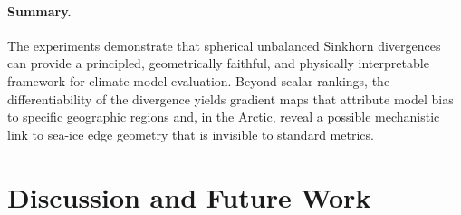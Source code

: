 \documentclass{article}
\theoremstyle{plain}
\theoremstyle{definition}
\theoremstyle{remark}
\begin{document}
\paragraph{Summary.}
The experiments demonstrate that spherical unbalanced Sinkhorn
divergences can provide a principled, geometrically faithful, and
physically interpretable framework for climate model evaluation.
Beyond scalar rankings, the differentiability of the divergence
yields gradient maps that attribute model bias to specific geographic
regions and, in the Arctic, reveal a possible mechanistic link to sea-ice
edge geometry that is invisible to standard metrics.




\section{Discussion and Future Work}
\end{document}
